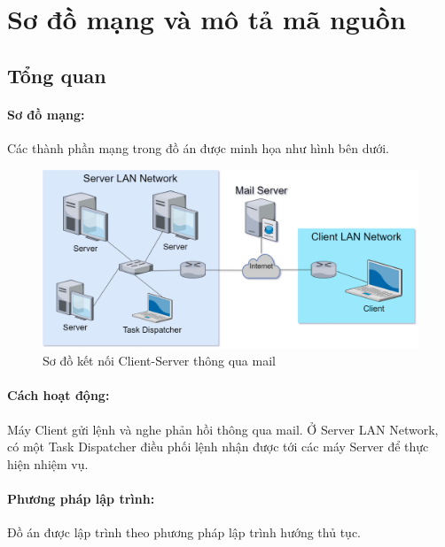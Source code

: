 \newpage
\section{Sơ đồ mạng và mô tả mã nguồn}
\subsection{Tổng quan}

\paragraph{Sơ đồ mạng:}{Các thành phần mạng trong đồ án được minh họa như hình bên dưới.}

\begin{figure}[H]
    \centering
    \includegraphics[width=1\linewidth]{img/net.png}
    \caption{Sơ đồ kết nối Client-Server thông qua mail}
\end{figure}

\paragraph{Cách hoạt động:}{Máy Client gửi lệnh và nghe phản hồi thông qua mail. Ở Server LAN Network, có một Task Dispatcher điều phối lệnh nhận được tới các máy Server để thực hiện nhiệm vụ.}

\paragraph{Phương pháp lập trình:}{Đồ án được lập trình theo phương pháp lập trình hướng thủ tục.}

